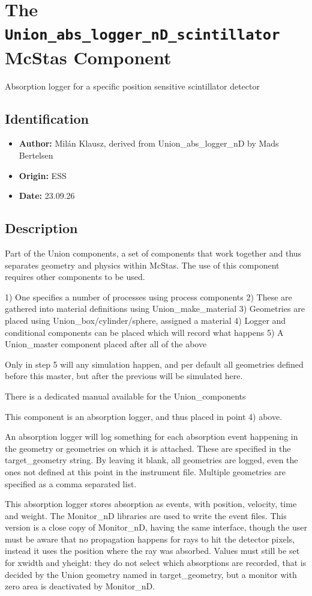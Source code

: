 \section{The \texttt{Union\_abs\_logger\_nD\_scintillator} McStas Component}
Absorption logger for a specific position sensitive scintillator detector

\subsection*{Identification}
\begin{itemize}
  \item \textbf{Author:} Milán Klausz, derived from Union\_abs\_logger\_nD by Mads Bertelsen
  \item \textbf{Origin:} ESS
  \item \textbf{Date:} 23.09.26
\end{itemize}

\subsection*{Description}
Part of the Union components, a set of components that work together and thus separates geometry and physics within McStas. The use of this component requires other components to be used.

1) One specifies a number of processes using process components 2) These are gathered into material definitions using Union\_make\_material 3) Geometries are placed using Union\_box/cylinder/sphere, assigned a material 4) Logger and conditional components can be placed which will record what happens 5) A Union\_master component placed after all of the above

Only in step 5 will any simulation happen, and per default all geometries defined before this master, but after the previous will be simulated here.

There is a dedicated manual available for the Union\_components

This component is an absorption logger, and thus placed in point 4) above.

An absorption logger will log something for each absorption event happening in the geometry or geometries on which it is attached. These are specified in the target\_geometry string. By leaving it blank, all geometries are logged, even the ones not defined at this point in the instrument file. Multiple geometries are specified as a comma separated list.

This absorption logger stores absorption as events, with position, velocity, time and weight. The Monitor\_nD libraries are used to write the event files. This version is a close copy of Monitor\_nD, having the same interface, though the user must be aware that no propagation happens for rays to hit the detector pixels, instead it uses the position where the ray was absorbed. Values must still be set for xwidth and yheight: they do not select which absorptions are recorded, that is decided by the Union geometry named in target\_geometry, but a monitor with zero area is deactivated by Monitor\_nD.

